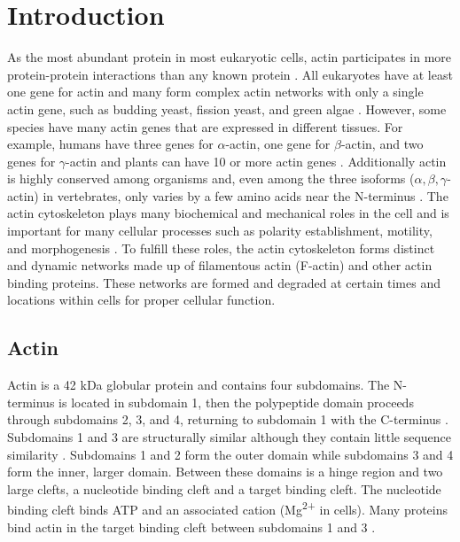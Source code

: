 
\chapter{Introduction}\label{ch:intro}
As the most abundant protein in most eukaryotic cells, actin participates in more protein-protein interactions than any known protein \citep{dominguez_actin_2011}. All eukaryotes have at least one gene for actin and many form complex actin networks with only a single actin gene, such as budding yeast, fission yeast, and green algae \citep{pollard_actin_2016}. However, some species have many actin genes that are expressed in different tissues. For example, humans have three genes for $\alpha$-actin, one gene for $\beta$-actin, and two genes for $\gamma$-actin and plants can have 10 or more actin genes \citep{pollard_actin_2016}. Additionally actin is highly conserved among organisms and, even among the three isoforms ($\alpha, \beta, \gamma$-actin) in vertebrates, only varies by a few amino acids near the N-terminus \citep{dominguez_actin_2011}. The actin cytoskeleton plays many biochemical and mechanical roles in the cell and is important for many cellular processes such as polarity establishment, motility, and morphogenesis \citep{blanchoin_actin_2014}. To fulfill these roles, the actin cytoskeleton forms distinct and dynamic networks made up of filamentous actin (F-actin) and other actin binding proteins. These networks are formed and degraded at certain times and locations within cells for proper cellular function. 

\section{Actin}\label{actin-intro}

Actin is a 42 kDa globular protein and contains four subdomains. The N-terminus is located in subdomain 1, then the polypeptide domain proceeds through subdomains 2, 3, and 4, returning to subdomain 1 with the C-terminus \citep{pollard_actin_2016}. Subdomains 1 and 3 are structurally similar although they contain little sequence similarity \citep{dominguez_actin_2009,pollard_actin_2016}. Subdomains 1 and 2 form the outer domain while subdomains 3 and 4 form the inner, larger domain. Between these domains is a hinge region and two large clefts, a nucleotide binding cleft and a target binding cleft. The nucleotide binding cleft binds ATP and an associated cation (Mg\textsuperscript{2+} in cells). Many proteins bind actin in the target binding cleft between subdomains 1 and 3 \citep{dominguez_actin_2009}.

